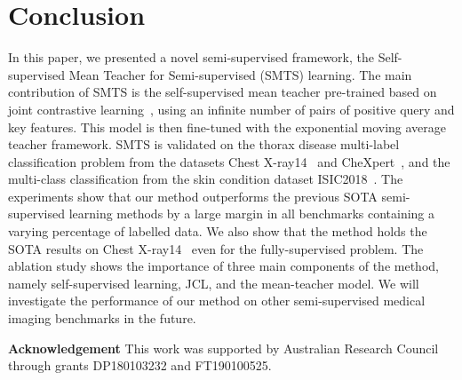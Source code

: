 \documentclass[runningheads]{llncs}
\begin{document}
\begin{table}[t!]
\centering
{}
\caption{Ablation studies of our method with different components on Chest X-Ray14. "Self-supervised" indicates the traditional self-supervised learning with contrastive loss~\cite{moco}. "JCL" replaces contrastive loss with ~\eqref{eq:loss_pre_train}, "MT" stands for fine-tuned with student-teacher learning instead only fine-tuned on only labelled samples.}\vspace{-.275in}

\label{tab:ablation}
\end{table}




\vspace{-.1in}
\section{Conclusion}
\vspace{-.1in}

In this paper, we presented a novel semi-supervised framework, the Self-supervised Mean Teacher for Semi-supervised (SMTS) learning.
The main contribution of SMTS is the  self-supervised mean teacher pre-trained based on joint contrastive learning~\cite{cai2020joint}, using an infinite number of pairs of positive query and key features.
This model is then fine-tuned with the exponential moving average teacher framework.
SMTS is validated on the thorax disease multi-label classification problem from the datasets
Chest X-ray14~\cite{wang2017chestx} and CheXpert~\cite{irvin2019chexpert}, and the multi-class classification from the skin condition dataset ISIC2018~\cite{tschandl2018ham10000, codella2019skin}. 
The experiments show that our method outperforms the previous SOTA semi-supervised learning methods by a large margin in all benchmarks containing a varying percentage of labelled data. 
We also show that the method holds the SOTA results on Chest X-ray14~\cite{wang2017chestx} even for the fully-supervised problem.
The ablation study shows the importance of three main components of the method, namely self-supervised learning, JCL, and the mean-teacher model. 
We will investigate the performance of our method on other semi-supervised medical imaging benchmarks in the future.

\textbf{Acknowledgement} This work was supported by Australian Research Council through grants DP180103232 and FT190100525.   





\end{document}

